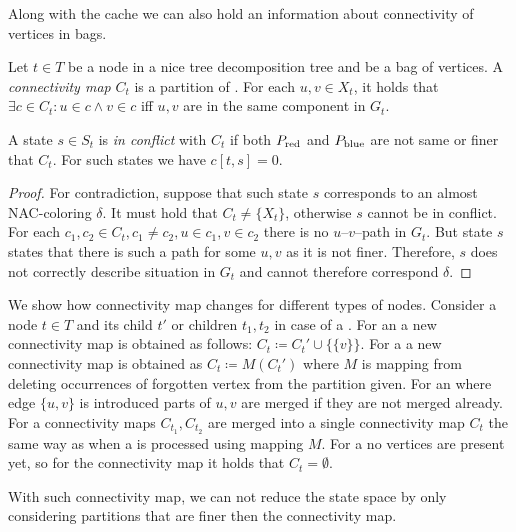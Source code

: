 Along with the cache we can also hold an information about connectivity of
vertices in bags.
%
\begin{definition}
	Let \( t \in T \) be a node in a nice tree decomposition tree and
	\Xt{} be a bag of vertices.
	A \emph{connectivity map} \( C_t \) is a partition of \Xt{}.
	For each \( u, v \in X_t \), it holds that
	\( \exists c \in C_t : u \in c \land v \in c \) iff
	\( u, v \) are in the same component in \( G_t \).
\end{definition}
%
\begin{lemma}
	A state \( s \in S_t \) is \emph{in conflict} with \( C_t \)
	if both \( P_{\text{red}} \) and \( P_{\text{blue}} \) are not same or finer that \( C_t \).
	For such states we have \( c[t, s] = 0 \).
\end{lemma}
%
\begin{proof}
	For contradiction, suppose that such state \( s \)
	corresponds to an almost NAC-coloring \( \delta \).
	It must hold that \( C_t \ne \{X_t\} \), otherwise \( s \) cannot be in conflict.
	For each \( c_1, c_2 \in C_t, c_1 \ne c_2, u \in c_1, v \in c_2 \)
	there is no \( u \)--\( v \)--path in \( G_t \).
	But state \( s \) states that there is such a path for some \( u, v \) as it is not finer.
	Therefore, \( s \) does not correctly describe situation in \( G_t \)
	and cannot therefore correspond \( \delta \).
\end{proof}
%
We show how connectivity map changes for different types of nodes.
Consider a node \( t \in T \) and its child \( t' \)
or children \( t_1, t_2 \) in case of a \JoinNode{}.
%
For an \IntroduceVertexNode{}
a new connectivity map is obtained as follows:
\( C_t \coloneqq C_t' \cup \{\{ v \}\} \).
%
For a \ForgetVertexNode{}
a new connectivity map is obtained as
\( C_t \coloneqq M(C_t') \)
where \( M \) is mapping from  
deleting occurrences of forgotten vertex from the partition given.
%
For an \IntroduceEdgeNode{}
where edge \( \{u, v\} \) is introduced
parts of \( u, v \) are merged if they are not merged already.
%
For a \JoinNode{}
connectivity maps \( C_{t_1}, C_{t_2} \) are merged into
a single connectivity map \( C_t \)
the same way as when a \JoinNode{} is processed using mapping \( M \).
%
For a \LeafNode{}
no vertices are present yet, so for the connectivity map it holds that \( C_t = \emptyset \).

With such connectivity map, we can not reduce the state space by only considering
partitions that are finer then the connectivity map.


